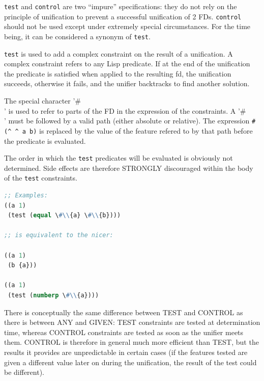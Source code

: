 \documentclass[10pt,a4paper]{report}
\begin{document}
\begin{appendices}
{\tt test} and {\tt control} are two ``impure'' specifications: they do
not rely on the principle of unification to prevent a successful
unification of 2 FDs.  {\tt control} should not be used except under
extremely special circumstances.  For the time being, it can be
considered a synonym of {\tt test}.

{\tt test} is used to add a complex constraint on the result of a unification.
A complex constraint refers to any Lisp predicate. If at the end of the
unification the predicate is satisfied when applied to the resulting fd,
the unification succeeds, otherwise it fails, and the unifier backtracks 
to find another solution.

The special character '\#\\' is used to refer to parts of the FD in the 
expression of the constraints. A '\#\\' must be followed by a valid path
(either absolute or relative). The expression {\tt \#\\(\^{} \^{} a b)} is replaced
by the value of the feature refered to by that path before the predicate
is evaluated. 

The order in which the {\tt test} predicates will be evaluated is obviously
not determined. Side effects are therefore STRONGLY discouraged within
the body of the {\tt test} constraints.

\begin{lstlisting}[language=Lisp]
;; Examples:
((a 1)
 (test (equal \#\\{a} \#\\{b}))) 

;; is equivalent to the nicer:

((a 1) 
 (b {a}))

((a 1)
 (test (numberp \#\\{a})))
\end{lstlisting}

There is conceptually the same difference between TEST and CONTROL as there
is between ANY and GIVEN: TEST constraints are tested at determination
time, whereas CONTROL constraints are tested as soon as the unifier meets
them.  CONTROL is therefore in general much more efficient than TEST, but
the results it provides are unpredictable in certain cases (if the features
tested are given a different value later on during the unification, the
result of the test could be different).



\end{appendices}
\end{document}
